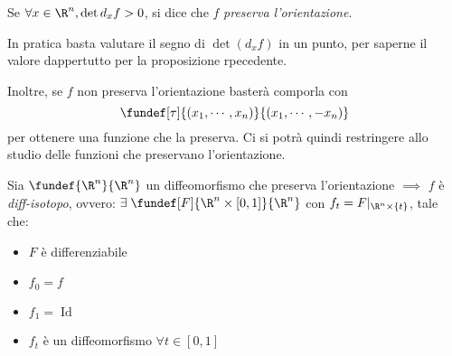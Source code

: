 \begin{defn}
Se $\forall x \in \R^n, \operatorname{det} d_xf > 0$, si dice che $f$ \emph{preserva l'orientazione}.
\end{defn}

\begin{oss}
In pratica basta valutare il segno di $\operatorname{det} (d_xf)$ in un punto, per saperne il valore dappertutto per la proposizione rpecedente.

Inoltre, se $f$ non preserva l'orientazione basterà comporla con
\begin{equation*}
\fundef[\tau]{(x_1,\cdots,x_n)}{(x_1,\cdots,-x_n)}
\end{equation*}
per ottenere una funzione che la preserva. Ci si potrà quindi restringere allo studio delle funzioni che preservano l'orientazione.
\end{oss}

\begin{teo}
Sia $\fundef{\R^n}{\R^n}$ un diffeomorfismo che preserva l'orientazione $\implies$ $f$ è \emph{diff-isotopo}, ovvero:
$\exists \; \fundef[F]{\R^n \times [0,1]}{\R^n}$ con $f_t = F|_{\R^n \times \{t\}}$, tale che:
\begin{itemize}
\item $F$ è differenziabile
\item $f_0=f$
\item $f_1 = \operatorname{Id}$
\item $f_t$ è un diffeomorfismo $\forall t \in [0,1]$
\end{itemize}
\end{teo}

